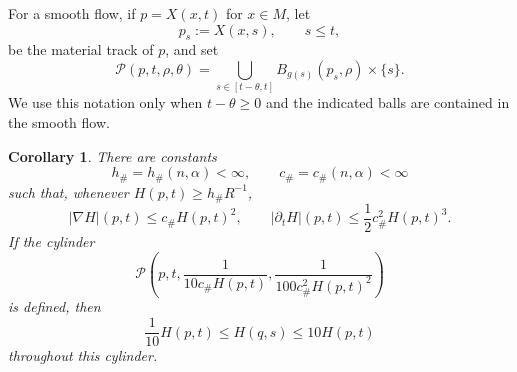 \documentclass[11pt,reqno]{amsart}
\newtheorem{corollary}[proposition]{Corollary}
\theoremstyle{definition}
\theoremstyle{remark}
\numberwithin{equation}{section}
\begin{document}
For a smooth flow, if $p=X(x,t)$ for $x\in M$, let
\begin{equation*}
    p_s:=X(x,s), \qquad s\leq t,
\end{equation*}
be the material track of $p$, and set
\begin{equation*}
 \mathcal P(p,t,\rho,\theta)
 =\bigcup_{s\in[t-\theta,t]}
 B_{g(s)}(p_s,\rho)\times\{s\}.
\end{equation*}
We use this notation only
when $t-\theta\geq0$ and the indicated balls are contained in the smooth
flow.

\begin{corollary}%
\label{cor:parabolic-control}
There are constants
\begin{equation*}
 h_\#=h_\#(n,\alpha)<\infty,
 \qquad c_\#=c_\#(n,\alpha)<\infty
\end{equation*}
such that, whenever $H(p,t)\geq h_\#R^{-1}$,
\begin{equation}\label{eq:H-derivative-ratios}
 |\nabla H|(p,t)\leq c_\#H(p,t)^2,
 \qquad
 |\partial_tH|(p,t)\leq\frac12c_\#^2H(p,t)^3.
\end{equation}
If the cylinder
\begin{equation*}
 \mathcal P\left(
 p,t,\frac1{10c_\#H(p,t)},
       \frac1{100c_\#^2H(p,t)^2}\right)
\end{equation*}
is defined, then
\begin{equation}\label{eq:parabolic-H-comparison}
 \frac1{10}H(p,t)\leq H(q,s)\leq10H(p,t)
\end{equation}
throughout this cylinder.
\end{corollary}
\end{document}
